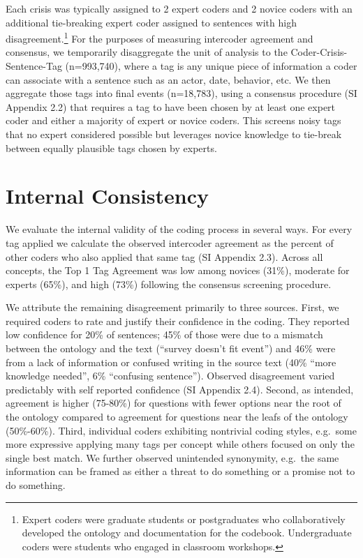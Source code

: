\documentclass{article}
\begin{document}
Each crisis was typically assigned to 2 expert coders and 2 novice
coders with an additional tie-breaking expert coder assigned to
sentences with high disagreement.\footnote{Expert coders were graduate
  students or postgraduates who collaboratively developed the ontology
  and documentation for the codebook. Undergraduate coders were students
  who engaged in classroom workshops.} For the purposes of measuring
intercoder agreement and consensus, we temporarily disaggregate the unit
of analysis to the Coder-Crisis-Sentence-Tag (n=993,740), where a tag is
any unique piece of information a coder can associate with a sentence
such as an actor, date, behavior, etc. We then aggregate those tags into
final events (n=18,783), using a consensus procedure (SI Appendix 2.2)
that requires a tag to have been chosen by at least one expert coder and
either a majority of expert or novice coders. This screens noisy tags
that no expert considered possible but leverages novice knowledge to
tie-break between equally plausible tags chosen by experts.

\hypertarget{internal-consistency}{%
\section{Internal Consistency}\label{internal-consistency}}

We evaluate the internal validity of the coding process in several ways.
For every tag applied we calculate the observed intercoder agreement as
the percent of other coders who also applied that same tag (SI Appendix
2.3). Across all concepts, the Top 1 Tag Agreement was low among novices
(31\%), moderate for experts (65\%), and high (73\%) following the
consensus screening procedure.

We attribute the remaining disagreement primarily to three sources.
First, we required coders to rate and justify their confidence in the
coding. They reported low confidence for 20\% of sentences; 45\% of
those were due to a mismatch between the ontology and the text (``survey
doesn't fit event'') and 46\% were from a lack of information or
confused writing in the source text (40\% ``more knowledge needed'', 6\%
``confusing sentence''). Observed disagreement varied predictably with
self reported confidence (SI Appendix 2.4). Second, as intended,
agreement is higher (75-80\%) for questions with fewer options near the
root of the ontology compared to agreement for questions near the leafs
of the ontology (50\%-60\%). Third, individual coders exhibiting
nontrivial coding styles, e.g.~some more expressive applying many tags
per concept while others focused on only the single best match. We
further observed unintended synonymity, e.g.~the same information can be
framed as either a threat to do something or a promise not to do
something.
\end{document}

